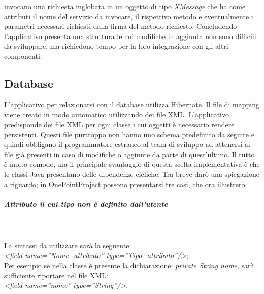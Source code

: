 invocano una richiesta inglobata in un oggetto di tipo \textit{XMessage} che ha come attributi il nome del servizio da invocare, il rispettivo metodo e eventualmente i parametri necessari richiesti dalla firma del metodo richiesto. Concludendo l\textquoteright{}applicativo presenta una struttura le cui modifiche in aggiunta non sono difficili da sviluppare, ma richiedono tempo per la loro integrazione con gli altri componenti. 

\subsection{Database}
L\textquoteright{}applicativo per relazionarsi con il database utilizza Hibernate. Il file di mapping viene creato in modo automatico utilizzando dei file XML. L\textquoteright{}applicativo predisponde dei file XML per ogni classe i cui oggetti \`{e} necessario rendere persistenti. Questi file purtroppo non hanno uno schema predefinito da seguire e quindi obbligano il programmatore estraneo al team di sviluppo ad attenersi ai file gi\`{a} presenti in caso di modifiche o aggiunte da parte di quest\textquoteright{}ultimo. Il tutto \`{e} molto comodo, ma il principale svantaggio di questa scelta implementativa \`{e} che le classi Java presentano delle dipendenze cicliche. Tra breve dar\`{o} una spiegazione a riguardo; in OnePointProject possono presentarsi tre casi, che ora illustrer\`{o}.

\subparagraph{Attributo il cui tipo non \`{e} definito dall\textquoteright{}utente} \quad \quad \\ \\
La sintassi da utilizzare sar\`{a} la seguente: \\
\textit{<field name=''Nome\_attributo'' type=''Tipo\_attributo''/>}; \\
Per esempio se nella classe \`{e} presente la dichiarazione: \textit{private String nome}, sar\`{a} sufficiente riportare nel file XML: \\
\textit{<field name=''nome'' type=''String''/>}.

